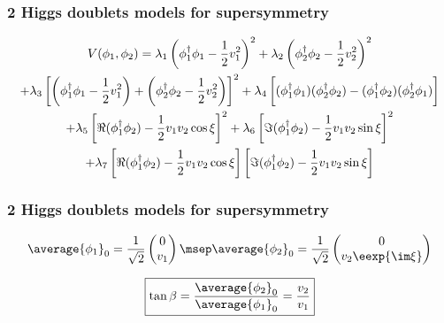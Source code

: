 \begin{frame}
\frametitle{2 Higgs doublets models for supersymmetry}
\begin{multline*}
V(\phi_1,\phi_2)
= \lambda_1 \left(\phi_1^\dagger\phi_1 - \frac{1}{2} v_1^2\right)^2
+ \lambda_2 \left(\phi_2^\dagger\phi_2 - \frac{1}{2} v_2^2\right)^2
\\
+ \lambda_3 \left[ \left(\phi_1^\dagger\phi_1 - \frac{1}{2} v_1^2\right) + \left(\phi_2^\dagger\phi_2 - \frac{1}{2} v_2^2\right) \right]^2
+ \lambda_4 \left[ (\phi_1^\dagger\phi_1)(\phi_2^\dagger\phi_2) - (\phi_1^\dagger\phi_2)(\phi_2^\dagger\phi_1) \vphantom{\frac{1}{2}}\right]
\\
+ \lambda_5 \left[ \Re(\phi_1^\dagger\phi_2) - \frac{1}{2} v_1v_2\cos\xi \right]^2
+ \lambda_6 \left[ \Im(\phi_1^\dagger\phi_2) - \frac{1}{2} v_1v_2\sin\xi \right]^2
\\
+ \lambda_7 \left[ \Re(\phi_1^\dagger\phi_2) - \frac{1}{2} v_1v_2\cos\xi \right]\left[ \Im(\phi_1^\dagger\phi_2) - \frac{1}{2} v_1v_2\sin\xi \right]
\end{multline*}
\end{frame}

\begin{frame}
\frametitle{2 Higgs doublets models for supersymmetry}
\begin{equation*}
\average{\phi_1}_0 = \frac{1}{\sqrt{2}} \begin{pmatrix}
0\\v_1
\end{pmatrix}
\msep
\average{\phi_2}_0 = \frac{1}{\sqrt{2}} \begin{pmatrix}
0\\v_2 \eexp{\im\xi}
\end{pmatrix}
\end{equation*}

\begin{equation*}
\boxed{\tan\beta = \frac{\average{\phi_2}_0}{\average{\phi_1}_0} = \frac{v_2}{v_1}}
\end{equation*}

\end{frame}

%

